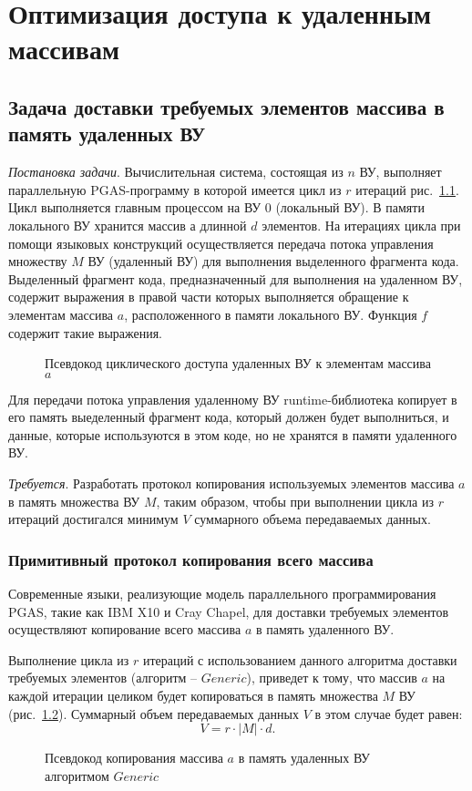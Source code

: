 \chapter{Оптимизация доступа к удаленным массивам} \label{chapt4}
\section{Задача доставки требуемых элементов массива в память удаленных ВУ}
\textit{Постановка задачи}. Вычислительная система, состоящая из $n$ ВУ,
выполняет параллельную PGAS-программу в которой имеется цикл из $r$ итераций
рис.~\ref{list:r_iterations_loop}. Цикл выполняется главным процессом на ВУ 0
(локальный ВУ). В памяти локального ВУ хранится массив $а$ длинной $d$
элементов. На итерациях цикла при помощи языковых конструкций осуществляется
передача потока управления множеству $M$ ВУ (удаленный ВУ) для выполнения
выделенного фрагмента кода. Выделенный фрагмент кода, предназначенный для
выполнения на удаленном ВУ, содержит выражения в правой части которых
выполняется обращение к элементам массива $a$, расположенного в памяти
локального ВУ. Функция $f$ содержит такие выражения.

\begin{figure}[!h]
	
    \caption{Псевдокод циклического доступа удаленных ВУ к элементам массива
$a$}
    \label{list:r_iterations_loop}
\end{figure}

Для передачи потока управления удаленному ВУ runtime-библиотека копирует в его
память выеделенный фрагмент кода, который должен будет выполниться, и данные,
которые используются в этом коде, но не хранятся в памяти удаленного ВУ.

\textit{Требуется}. Разработать протокол копирования используемых элементов
массива $a$ в память множества ВУ $M$, таким образом, чтобы при выполнении цикла
из $r$ итераций достигался минимум $V$ суммарного объема передаваемых данных.

\subsection{Примитивный протокол копирования всего массива}
Современные языки, реализующие модель параллельного программирования PGAS,
такие как IBM X10 и Cray Chapel, для доставки требуемых элементов осуществляют
копирование всего массива $a$ в память удаленного ВУ.

Выполнение цикла из $r$ итераций с использованием данного алгоритма доставки
требуемых элементов (алгоритм -- $Generic$), приведет к тому, что массив $a$ на
каждой итерации целиком будет копироваться в память множества $M$ ВУ
(рис.~\ref{list:r_iterations_loop_generic}). Суммарный объем передаваемых данных
$V$ в этом случае будет равен:
\[ V = r \cdot |M| \cdot d. \]
\begin{figure}[!h]
	
    \caption{Псевдокод копирования массива $a$ в память удаленных ВУ алгоритмом 
$Generic$}
    \label{list:r_iterations_loop_generic}
\end{figure}

